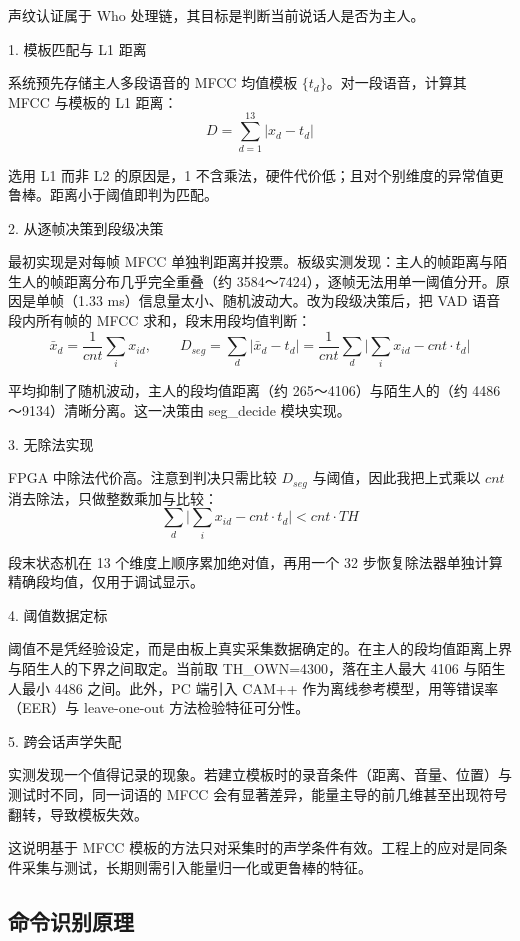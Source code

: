 \documentclass[UTF8,zihao=-4,fontset=windows]{ctexart}
\newcommand{\code}[1]{{\ttfamily #1}}
\newcommand{\subhead}[1]{%
  \par\medskip
  {\heiti\zihao{-4}#1}
  \nopagebreak
  \par\smallskip
}
\begin{document}
声纹认证属于 Who 处理链，其目标是判断当前说话人是否为主人。

\subhead{1. 模板匹配与 L1 距离}

系统预先存储主人多段语音的 MFCC 均值模板 $\{t_d\}$。对一段语音，计算其 MFCC 与模板的 L1 距离：
\[
D=\sum_{d=1}^{13}|x_d-t_d|
\]

选用 L1 而非 L2 的原因是，1 不含乘法，硬件代价低；且对个别维度的异常值更鲁棒。距离小于阈值即判为匹配。

\subhead{2. 从逐帧决策到段级决策}

最初实现是对每帧 MFCC 单独判距离并投票。板级实测发现：主人的帧距离与陌生人的帧距离分布几乎完全重叠（约 3584～7424），逐帧无法用单一阈值分开。原因是单帧（1.33 ms）信息量太小、随机波动大。改为段级决策后，把 VAD 语音段内所有帧的 MFCC 求和，段末用段均值判断：
\[
\bar{x}_d=\frac{1}{cnt}\sum_i x_{id},\qquad
D_{seg}=\sum_d\left|\bar{x}_d-t_d\right|=\frac{1}{cnt}\sum_d\Big|\sum_i x_{id}-cnt\cdot t_d\Big|
\]

平均抑制了随机波动，主人的段均值距离（约 265～4106）与陌生人的（约 4486～9134）清晰分离。这一决策由 \code{seg\_decide} 模块实现。

\subhead{3. 无除法实现}

FPGA 中除法代价高。注意到判决只需比较 $D_{seg}$ 与阈值，因此我把上式乘以 $cnt$ 消去除法，只做整数乘加与比较：
\[
\sum_d\Big|\sum_i x_{id}-cnt\cdot t_d\Big|<cnt\cdot TH
\]

段末状态机在 13 个维度上顺序累加绝对值，再用一个 32 步恢复除法器单独计算精确段均值，仅用于调试显示。

\subhead{4. 阈值数据定标}

阈值不是凭经验设定，而是由板上真实采集数据确定的。在主人的段均值距离上界与陌生人的下界之间取定。当前取 \code{TH\_OWN}=4300，落在主人最大 4106 与陌生人最小 4486 之间。此外，PC 端引入 CAM++ 作为离线参考模型，用等错误率（EER）与 leave-one-out 方法检验特征可分性。

\subhead{5. 跨会话声学失配}

实测发现一个值得记录的现象。若建立模板时的录音条件（距离、音量、位置）与测试时不同，同一词语的 MFCC 会有显著差异，能量主导的前几维甚至出现符号翻转，导致模板失效。

这说明基于 MFCC 模板的方法只对采集时的声学条件有效。工程上的应对是同条件采集与测试，长期则需引入能量归一化或更鲁棒的特征。

\subsection{命令识别原理}
\end{document}
